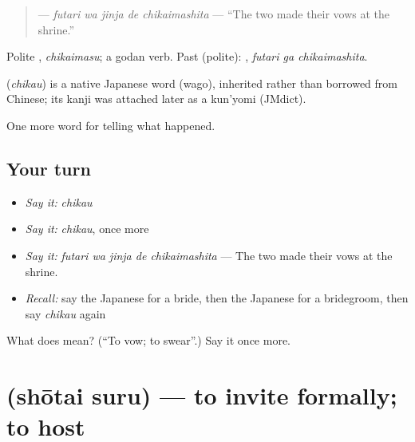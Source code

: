 \begin{quote}
\textbf{  } — \emph{futari wa jinja de chikaimashita} — \textquotedblleft{}The two made their vows at the shrine.\textquotedblright{}
\end{quote}

Polite \textbf{}, \emph{chikaimasu}; a godan verb. Past (polite): \textbf{ }, \emph{futari ga chikaimashita}.

\begin{cousinweb}
\textbf{} (\emph{chikau}) is a native Japanese word (wago), inherited rather than borrowed from Chinese; its kanji was attached later as a kun'yomi (JMdict).
\end{cousinweb}

\begin{grammarlens}[title={What you've built}]
One more word for telling what happened.
\end{grammarlens}

\subsection*{Your turn}
\begin{itemize}
\raggedright
  \item \emph{Say it:} \emph{chikau}
  \item \emph{Say it:} \emph{chikau}, once more
  \item \emph{Say it:} \emph{futari wa jinja de chikaimashita} — The two made their vows at the shrine.
  \item \emph{Recall:} say the Japanese for a bride, then the Japanese for a bridegroom, then say \emph{chikau} again
\end{itemize}

\begin{tcolorbox}[breakable,colback=teal!4,colframe=teal!35!black,title={Before you move on}]
What does  mean? (\textquotedblleft{}To vow; to swear\textquotedblright{}.) Say it once more.
\end{tcolorbox}
\section[\texorpdfstring{\ja{しょうたいする} (shōtai suru)}{しょうたいする (shōtai suru)}]{ (shōtai suru) — to invite formally; to host}

\label{lesson:JA-C289-shoutai-suru}



